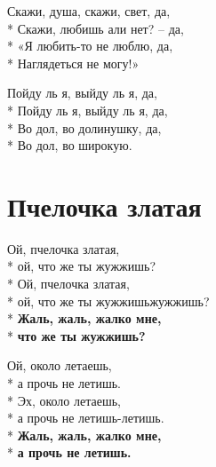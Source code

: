 \medskip

\begin{minipage}{\linewidth}
Скажи, душа, скажи, свет, да,\\*
Скажи, любишь али нет? – да,\\*
«Я любить-то не люблю, да,\\*
Наглядеться не могу!»\\
\end{minipage}\par\medskip\nobreak

\medskip

\begin{minipage}{\linewidth}
Пойду ль я, выйду ль я, да,\\*
Пойду ль я, выйду ль я, да,\\*
Во дол, во долинушку, да,\\*
Во дол, во широкую.\\
\end{minipage}

\vspace{\fill}\newpage

\section{Пчелочка златая}
\label{song:Пчелочка_златая}

\medskip

\begin{minipage}{\linewidth}
Ой, пчелочка златая,\\*
ой, что же ты жужжишь?\\*
Ой, пчелочка златая,\\*
ой, что же ты жужжишьжужжишь?\\*
\textbf{Жаль, жаль, жалко мне,}\\*
\textbf{что же ты жужжишь?}\\
\end{minipage}\par\medskip\nobreak

\medskip

\begin{minipage}{\linewidth}
Ой, около летаешь,\\*
а прочь не летишь.\\*
Эх, около летаешь,\\*
а прочь не летишь-летишь.\\*
\textbf{Жаль, жаль, жалко мне,}\\*
\textbf{а прочь не летишь.}\\
\end{minipage}\par\medskip\nobreak

